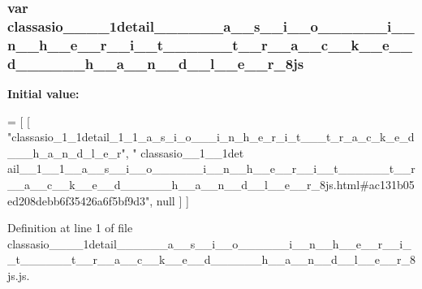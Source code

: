 \subsubsection[{classasio\+\_\+\+\_\+1\+\_\+\+\_\+1detail\+\_\+\+\_\+1\+\_\+\+\_\+1\+\_\+\+\_\+a\+\_\+\+\_\+s\+\_\+\+\_\+i\+\_\+\+\_\+o\+\_\+\+\_\+\+\_\+\+\_\+\+\_\+\+\_\+i\+\_\+\+\_\+n\+\_\+\+\_\+h\+\_\+\+\_\+e\+\_\+\+\_\+r\+\_\+\+\_\+i\+\_\+\+\_\+t\+\_\+\+\_\+\+\_\+\+\_\+\+\_\+\+\_\+t\+\_\+\+\_\+r\+\_\+\+\_\+a\+\_\+\+\_\+c\+\_\+\+\_\+k\+\_\+\+\_\+e\+\_\+\+\_\+d\+\_\+\+\_\+\+\_\+\+\_\+\+\_\+\+\_\+h\+\_\+\+\_\+a\+\_\+\+\_\+n\+\_\+\+\_\+d\+\_\+\+\_\+l\+\_\+\+\_\+e\+\_\+\+\_\+r\+\_\+8js}]{\setlength{\rightskip}{0pt plus 5cm}var classasio\+\_\+\+\_\+\_\+\+\_\+1detail\+\_\+\+\_\+\_\+\+\_\+\_\+\+\_\+a\+\_\+\+\_\+s\+\_\+\+\_\+i\+\_\+\+\_\+o\+\_\+\+\_\+\+\_\+\+\_\+\+\_\+\+\_\+i\+\_\+\+\_\+n\+\_\+\+\_\+h\+\_\+\+\_\+e\+\_\+\+\_\+r\+\_\+\+\_\+i\+\_\+\+\_\+t\+\_\+\+\_\+\+\_\+\+\_\+\+\_\+\+\_\+t\+\_\+\+\_\+r\+\_\+\+\_\+a\+\_\+\+\_\+c\+\_\+\+\_\+k\+\_\+\+\_\+e\+\_\+\+\_\+d\+\_\+\+\_\+\+\_\+\+\_\+\+\_\+\+\_\+h\+\_\+\+\_\+a\+\_\+\+\_\+n\+\_\+\+\_\+d\+\_\+\+\_\+l\+\_\+\+\_\+e\+\_\+\+\_\+r\+\_\+8js}\label{classasio____1____1detail____1____1____a____s____i____o____________i____n____h____e____r____i___82a629ae70a9a67d9043404cfb3ca3d1_a9fa37325e99d3d4326e620682221918d}
{\bfseries Initial value\+:}
\begin{DoxyCode}
=
[
    [ \textcolor{stringliteral}{"classasio\_1\_1detail\_1\_1\_a\_s\_i\_o\_\_\_i\_n\_h\_e\_r\_i\_t\_\_\_t\_r\_a\_c\_k\_e\_d\_\_\_h\_a\_n\_d\_l\_e\_r"}, \textcolor{stringliteral}{"
      classasio\_\_1\_\_1det
      ail\_\_1\_\_1\_\_a\_\_s\_\_i\_\_o\_\_\_\_\_\_i\_\_n\_\_h\_\_e\_\_r\_\_i\_\_t\_\_\_\_\_\_t\_\_r\_\_a\_\_c\_\_k\_\_e\_\_d\_\_\_\_\_\_h\_\_a\_\_n\_\_d\_\_l\_\_e\_\_r\_8js.html#ac131b05ed208debb6f35426a6f5bf9d3"}, null ]
]
\end{DoxyCode}


Definition at line 1 of file classasio\+\_\+\+\_\+\_\+\+\_\+1detail\+\_\+\+\_\+\_\+\+\_\+\_\+\+\_\+a\+\_\+\+\_\+s\+\_\+\+\_\+i\+\_\+\+\_\+o\+\_\+\+\_\+\+\_\+\+\_\+\+\_\+\+\_\+i\+\_\+\+\_\+n\+\_\+\+\_\+h\+\_\+\+\_\+e\+\_\+\+\_\+r\+\_\+\+\_\+i\+\_\+\+\_\+t\+\_\+\+\_\+\+\_\+\+\_\+\+\_\+\+\_\+t\+\_\+\+\_\+r\+\_\+\+\_\+a\+\_\+\+\_\+c\+\_\+\+\_\+k\+\_\+\+\_\+e\+\_\+\+\_\+d\+\_\+\+\_\+\+\_\+\+\_\+\+\_\+\+\_\+h\+\_\+\+\_\+a\+\_\+\+\_\+n\+\_\+\+\_\+d\+\_\+\+\_\+l\+\_\+\+\_\+e\+\_\+\+\_\+r\+\_\+8js.\+js.

